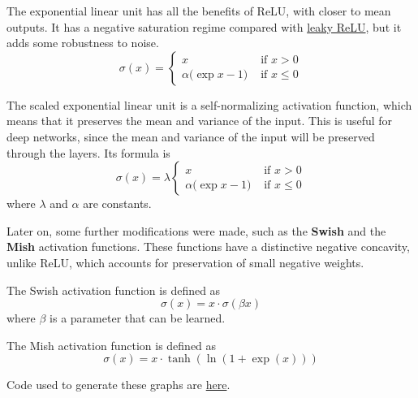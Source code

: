   \begin{definition}[ELU]
    \label{def:elu}
    The exponential linear unit has all the benefits of ReLU, with closer to mean outputs. It has a negative saturation regime compared with \hyperref[def:leaky-relu]{leaky ReLU}, but it adds some robustness to noise. 
    \begin{equation}
      \sigma(x) = \begin{cases} x & \text{ if } x > 0 \\ \alpha \big(\exp{x} - 1 \big) & \text{ if } x \leq 0 \end{cases}
    \end{equation}
  \end{definition}

  \begin{definition}[SELU]
    \label{def:selu}
    The scaled exponential linear unit is a self-normalizing activation function, which means that it preserves the mean and variance of the input. This is useful for deep networks, since the mean and variance of the input will be preserved through the layers. Its formula is 
    \begin{equation}
      \sigma(x) = \lambda \begin{cases} x & \text{ if } x > 0 \\ \alpha \big(\exp{x} - 1 \big) & \text{ if } x \leq 0 \end{cases}
    \end{equation}
    where $\lambda$ and $\alpha$ are constants.
  \end{definition}
  
  Later on, some further modifications were made, such as the \textbf{Swish} and the \textbf{Mish} \cite{mish} activation functions. These functions have a distinctive negative concavity, unlike ReLU, which accounts for preservation of small negative weights.  

  \begin{definition}[Swish]
    \label{def:swish}
    The Swish activation function is defined as 
    \begin{equation}
      \sigma(x) = x \cdot \sigma(\beta x) 
    \end{equation}
    where $\beta$ is a parameter that can be learned. 
  \end{definition}

  \begin{definition}[Mish]
    \label{def:mish}
    The Mish activation function is defined as 
    \begin{equation}
      \sigma(x) = x \cdot \tanh(\ln(1 + \exp(x))) 
    \end{equation}
  \end{definition}

  \begin{code} 
    Code used to generate these graphs are \href{code/activation_functions.ipynb}{here}.
  \end{code} 


